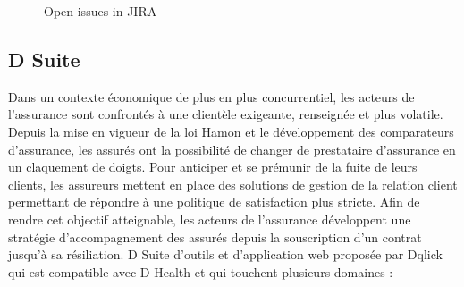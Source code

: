                 \begin{figure}[H]
\centering
{}
\caption{Open issues in JIRA}
\label{fig:Mod-Enseig}
\end{figure}
                      
\subsection{D Suite}     
Dans un contexte économique de plus en plus concurrentiel, les acteurs de l’assurance sont confrontés à une clientèle exigeante,
renseignée et plus volatile. Depuis la mise en vigueur de la loi Hamon et le développement des comparateurs d’assurance, les assurés ont la
possibilité de changer de prestataire d’assurance en un claquement de doigts.
Pour anticiper et se prémunir de la fuite de leurs clients, les assureurs mettent en place des solutions de gestion de la relation client permettant
de répondre à une politique de satisfaction plus stricte. Afin de rendre cet objectif atteignable, les acteurs de l’assurance développent une
stratégie d’accompagnement des assurés depuis la souscription d’un contrat jusqu’à sa résiliation.
D Suite d'outils et d'application web proposée par Dqlick qui est  compatible avec D Health et qui touchent plusieurs domaines :

